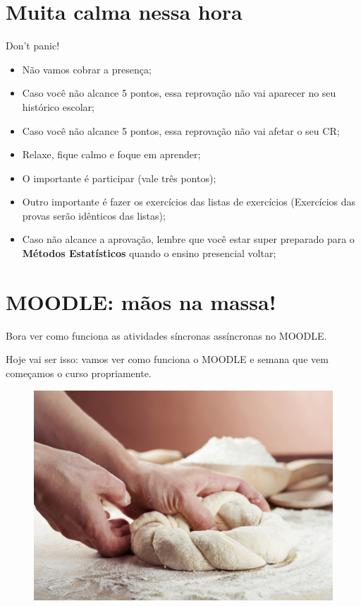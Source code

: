 \documentclass[9pt]{beamer}
\begin{document}
\section{Muita calma nessa hora}

\begin{frame}{Don't panic!}

\begin{itemize}
	\item Não vamos cobrar a presença;
	\vfill
	
	\item Caso você não alcance 5 pontos, essa reprovação não vai aparecer no seu histórico escolar;
	\vfill
	
	\item Caso você não alcance 5 pontos, essa reprovação não vai afetar o seu CR;
	\vfill
	
	\item Relaxe, fique calmo e foque em aprender;
	\vfill
	
	\item O importante é participar (vale três pontos);
	\vfill
	
	\item Outro importante é fazer os exercícios das listas de exercícios (Exercícios das provas serão idênticos das listas);
	\vfill
	
	\item Caso não alcance a aprovação, lembre que você estar super preparado para o {\bf Métodos Estatísticos} quando o ensino presencial voltar;
\end{itemize}

\end{frame}

\section{MOODLE: mãos na massa!}

\begin{frame}{}

Bora ver como funciona as atividades síncronas assíncronas no MOODLE. 

Hoje vai ser isso: vamos ver como funciona o MOODLE e semana que vem começamos o curso propriamente.

\begin{figure}[!htbp]
	\centering
	\includegraphics[width=0.75\linewidth]{oficina_de_macarrao_caseiro.jpg}
\end{figure}

\end{frame}
\end{document}
